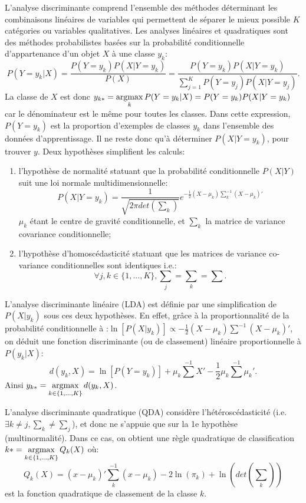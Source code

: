 L'analyse discriminante comprend l'ensemble des méthodes déterminant les combinaisons linéaires de variables qui permettent de séparer le mieux possible $K$ catégories ou variables qualitatives. Les analyses linéaires et quadratiques sont des méthodes probabilistes basées sur la probabilité conditionnelle d'appartenance d'un objet $X$ à une classe $y_k$: \[P(Y=y_k \vert X) = \frac{P(Y=y_k) P(X \vert Y=y_k)}{P(X)} = \frac{P(Y=y_k) P(X \vert Y=y_k)}{\sum\limits_{j = 1}^K P(Y=y_j) P(X \vert Y=y_j)}.\]
La classe de $X$ est donc $y_{k*} = \mathop{\mathrm{argmax}}\limits_k P(Y=y_k \vert X) = P(Y=y_k) P(X \vert Y=y_k)$ car le dénominateur est le même pour toutes les classes. Dans cette expression, $P(Y=y_k)$ est la proportion d'exemples de classes $y_k$ dans l'ensemble des données d'apprentissage. Il ne reste donc qu'à déterminer $P(X \vert Y=y_k)$, pour trouver $y$. Deux hypothèses simplifient les calculs:
\begin{enumerate}
	\item l'hypothèse de normalité statuant que la probabilité conditionnelle $P(X \vert Y)$ suit une loi normale multidimensionnelle: \[P(X \vert Y = y_k) = \frac{1}{\sqrt{2\pi det(\sum_k)}}e^{-\frac{1}{2}(X - \mu_k)\sum_k^{-1}(X - \mu_k)'} \] $\mu_k$ étant le centre de gravité conditionnelle, et $\sum_k$ la matrice de variance covariance conditionnelle;
	\item l'hypothèse d'homoscédasticité statuant que les matrices de variance co-variance conditionnelles sont identiques i.e.: \[\forall j,k \in \lbrace 1,...,K \rbrace, \sum_j = \sum_k = \sum.\]
\end{enumerate}

L'analyse discriminante linéaire (LDA) est définie par une simplification de $P(X \vert y_k)$ sous ces deux hypothèses. En effet, grâce à la proportionnalité de la probabilité conditionnelle à :$\ln\left[P(X \vert y_k)\right] \propto -\frac{1}{2}( X - \mu_k )\sum^{-1}(X - \mu_k )'$, on déduit une fonction discriminante (ou de classement) linéaire proportionnelle à $P(y_k \vert X)$: \[d(y_k, X) = \ln\left[P(Y = y_k)\right] + \mu_k \sum^{-1}X' - \frac{1}{2}\mu_k\sum^{-1}\mu_k'.\] Ainsi $y_{k*} = \mathop{\mathrm{argmax}}\limits_{k \in \lbrace 1,...,K \rbrace} d(y_k, X)$.

L'analyse discriminante quadratique (QDA) considère l'hétéroscédasticité (i.e. $\exists k \neq j, \sum_k \neq \sum_j$), et donc ne s'appuie que sur la 1e hypothèse (multinormalité). Dans ce cas, on obtient une règle quadratique de classification $k* = \mathop{\mathrm{argmax}}\limits_{k \in \lbrace 1,...,K \rbrace} Q_k(X)$ où:
\[Q_k(X) = (x - \mu_k)'\sum_k^{-1}(x - \mu_k) - 2 \ln(\pi_k) + \ln(det(\sum_k))\] est la fonction quadratique de classement de la classe $k$.

